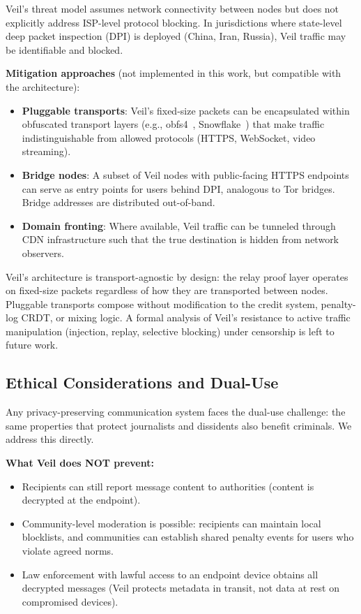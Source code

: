 \documentclass[11pt,a4paper]{article}
\begin{document}
Veil's threat model assumes network connectivity between nodes but does not explicitly address ISP-level protocol blocking. In jurisdictions where state-level deep packet inspection (DPI) is deployed (China, Iran, Russia), Veil traffic may be identifiable and blocked.

\textbf{Mitigation approaches} (not implemented in this work, but compatible with the architecture):
\begin{itemize}[nosep]
    \item \textbf{Pluggable transports}: Veil's fixed-size packets can be encapsulated within obfuscated transport layers (e.g., obfs4~\cite{obfs4}, Snowflake~\cite{snowflake}) that make traffic indistinguishable from allowed protocols (HTTPS, WebSocket, video streaming).
    \item \textbf{Bridge nodes}: A subset of Veil nodes with public-facing HTTPS endpoints can serve as entry points for users behind DPI, analogous to Tor bridges. Bridge addresses are distributed out-of-band.
    \item \textbf{Domain fronting}: Where available, Veil traffic can be tunneled through CDN infrastructure such that the true destination is hidden from network observers.
\end{itemize}

Veil's architecture is transport-agnostic by design: the relay proof layer operates on fixed-size packets regardless of how they are transported between nodes. Pluggable transports compose without modification to the credit system, penalty-log CRDT, or mixing logic. A formal analysis of Veil's resistance to active traffic manipulation (injection, replay, selective blocking) under censorship is left to future work.

\subsection{Ethical Considerations and Dual-Use}
\label{sec:ethics}

Any privacy-preserving communication system faces the dual-use challenge: the same properties that protect journalists and dissidents also benefit criminals. We address this directly.

\textbf{What Veil does NOT prevent:}
\begin{itemize}[nosep]
    \item Recipients can still report message content to authorities (content is decrypted at the endpoint).
    \item Community-level moderation is possible: recipients can maintain local blocklists, and communities can establish shared penalty events for users who violate agreed norms.
    \item Law enforcement with lawful access to an endpoint device obtains all decrypted messages (Veil protects metadata in transit, not data at rest on compromised devices).
\end{itemize}
\end{document}
